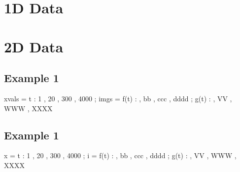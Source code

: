 \documentclass[12pt]{article}
\begin{document}


\section{1D Data}

\section{2D Data}

\subsection{Example 1}

\begin{functable}
    xvals =    t : 1 , 20 , 300 , 4000 ;
    imgs  = f(t) :  , bb , ccc , dddd ;
            g(t) :  , VV , WWW , XXXX
\end{functable}


\subsection{Example 1}

\begin{functable}
    x =    t : 1 , 20 , 300 , 4000 ;
    i = f(t) :  , bb , ccc , dddd ;
        g(t) :  , VV , WWW , XXXX
\end{functable}


%
%
%
%
%
%
%


%
%
%
\end{document}
